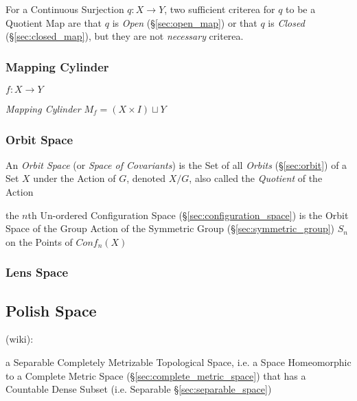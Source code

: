 For a Continuous Surjection $q : X \rightarrow Y$, two sufficient criterea for
$q$ to be a Quotient Map are that $q$ is \emph{Open} (\S\ref{sec:open_map}) or
that $q$ is \emph{Closed} (\S\ref{sec:closed_map}), but they are not
\emph{necessary} criterea.



\subsubsection{Mapping Cylinder}\label{sec:mapping_cylinder}

$f : X \rightarrow Y$

\emph{Mapping Cylinder} $M_f = (X \times I) \sqcup Y$



\subsubsection{Orbit Space}\label{sec:orbit_space}

An \emph{Orbit Space} (or \emph{Space of Covariants}) is the Set of all
\emph{Orbits} (\S\ref{sec:orbit}) of a Set $X$ under the Action of $G$, denoted
$X / G$, also called the \emph{Quotient} of the Action

the $n$th Un-ordered Configuration Space (\S\ref{sec:configuration_space}) is
the Orbit Space of the Group Action of the Symmetric Group
(\S\ref{sec:symmetric_group}) $S_n$ on the Points of $Conf_n(X)$



\subsubsection{Lens Space}\label{sec:lens_space}



\subsection{Polish Space}\label{sec:polish_space}

(wiki):

a Separable Completely Metrizable Topological Space, i.e. a Space Homeomorphic
to a Complete Metric Space (\S\ref{sec:complete_metric_space}) that has a
Countable Dense Subset (i.e. Separable \S\ref{sec:separable_space})

